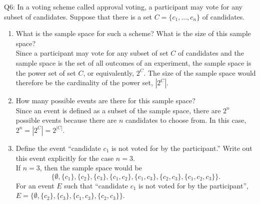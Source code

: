 \documentclass[12pt]{article}
\begin{document}
\noindent Q6: In a voting scheme called approval voting, a participant may vote for any subset of candidates. Suppose that there is a set $C = \big \{ c_1,...,c_n \big \}$ of candidates.

\begin{center}
\begin{enumerate}[label=(\alph*)]
\item What is the sample space for such a scheme? What is the size of this
sample space? \\
\vspace{0.3cm}
Since a participant may vote for any subset of set $C$ of candidates and the sample space is the set of all outcomes of an experiment, the sample space is the power set of set $C$, or equivalently, $2^C$. The size of the sample space would therefore be the cardinality of the power set, $|2^C|$. 

\item How many possible events are there for this sample space? \\
\vspace{0.3cm}
Since an event is defined as a subset of the sample space, there are $2^n$ possible events because there are $n$ candidates to choose from. In this case, $2^n=|2^C|=2^{|C|}$. \\

\item Define the event ``candidate $c_1$ is not voted for by the participant.'' Write out this event explicitly for the case $n = 3$. \\
\vspace{0.3cm}
If $n=3$, then the sample space would be 
\begin{equation*}
\big \{\emptyset, \{c_1\}, \{c_2\}, \{c_3\}, \{c_1, c_2\}, \{c_1, c_3\}, \{c_2, c_3\}, \{c_1, c_2, c_3\} \big \}.
\end{equation*}
\noindent
For an event $E$ such that ``candidate $c_1$ is not voted for by the participant'', $E= \big \{\emptyset, \{c_2\}, \{c_3\}, \{c_1, c_3\}, \{c_2, c_3\} \big \}$.
 \end{enumerate}
\end{center}
\end{document}
